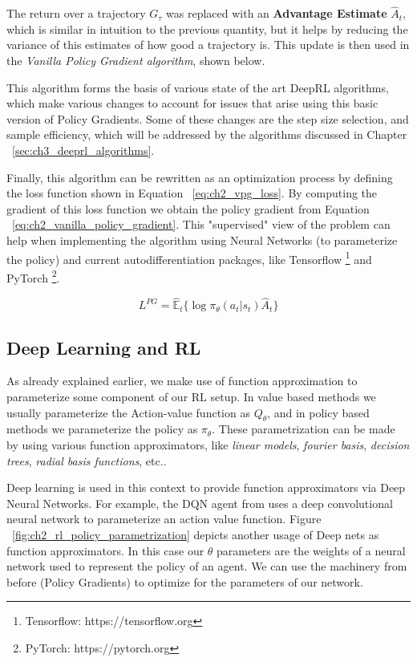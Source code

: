 The return over a trajectory $G_{\tau}$ was replaced with an \textbf{Advantage Estimate}
$\hat A_{t}$, which is similar in intuition to the previous quantity, but it helps
by reducing the variance of this estimates of how good a trajectory is. This update
is then used in the \textit{Vanilla Policy Gradient algorithm}, shown below.

\algVanillaPolicyGradients

This algorithm forms the basis of various state of the art DeepRL algorithms, which
make various changes to account for issues that arise using this basic version of 
Policy Gradients. Some of these changes are the step size selection, and sample
efficiency, which will be addressed by the algorithms discussed in Chapter ~\ref{sec:ch3_deeprl_algorithms}.

Finally, this algorithm can be rewritten as an optimization process by defining the
loss function shown in Equation ~\ref{eq:ch2_vpg_loss}. By computing the gradient 
of this loss function we obtain the policy gradient from Equation ~\ref{eq:ch2_vanilla_policy_gradient}.
This "supervised" view of the problem can help when implementing the algorithm
using Neural Networks (to parameterize the policy) and current autodifferentiation 
packages, like Tensorflow \footnote{Tensorflow: https://tensorflow.org} and PyTorch \footnote{PyTorch: https://pytorch.org}. 

\begin{equation} \label{eq:ch2_vpg_loss}
    L^{PG} = \mathbb{\hat E}_{t} \lbrace \log \pi_{\theta} (a_{t} | s_{t}) \hat A_{t} \rbrace
\end{equation}

\subsection{Deep Learning and RL}

As already explained earlier, we make use of function approximation to parameterize
some component of our RL setup. In value based methods we usually parameterize the
Action-value function as $Q_{\theta}$, and in policy based methods we parameterize
the policy as $\pi_{\theta}$. These parametrization can be made by using various
function approximators, like \textit{linear models}, \textit{fourier basis}, 
\textit{decision trees}, \textit{radial basis functions}, etc..

Deep learning is used in this context to provide function approximators via Deep
Neural Networks. For example, the DQN agent from \cite{DQNAtari} uses a deep convolutional
neural network to parameterize an action value function. Figure ~\ref{fig:ch2_rl_policy_parametrization}
depicts another usage of Deep nets as function approximators. In this case our 
$\theta$ parameters are the weights of a neural network used to represent the policy 
of an agent. We can use the machinery from before (Policy Gradients) to optimize for 
the parameters of our network.

